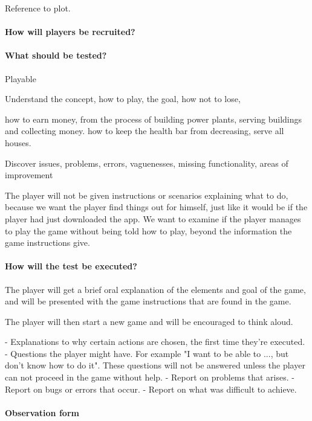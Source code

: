 Reference to plot.

\paragraph{How will players be recruited?}

\paragraph{What should be tested?}

Playable

Understand the concept, how to play, the goal, how not to lose, 

how to earn money, from the process of building power plants, serving buildings and collecting money.
how to keep the health bar from decreasing, serve all houses.

Discover issues, problems, errors, vaguenesses, missing functionality, areas of improvement

The player will not be given instructions or scenarios explaining what to do, because we want the player find things out for himself, just like it would be if the player had just downloaded the app. We want to examine if the player manages to play the game without being told how to play, beyond the information the game instructions give. 

\paragraph{How will the test be executed?}

The player will get a brief oral explanation of the elements and goal of the game, and will be presented with the game instructions that are found in the game.

The player will then start a new game and will be encouraged to think aloud. 

- Explanations to why certain actions are chosen, the first time they're executed.
- Questions the player might have. For example "I want to be able to ..., but don't know how to do it". These questions will not be answered unless the player can not proceed in the game without help.
- Report on problems that arises.
- Report on bugs or errors that occur.
- Report on what was difficult to achieve.

\paragraph{Observation form}

